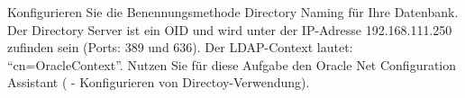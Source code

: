     \item Konfigurieren Sie die Benennungsmethode Directory Naming für Ihre
    Datenbank. Der Directory Server ist ein OID und wird unter der IP-Adresse
    192.168.111.250 zufinden sein (Ports: 389 und 636). Der LDAP-Context
    lautet: \enquote{cn=OracleContext}. Nutzen Sie für diese Aufgabe den
    Oracle Net Configuration Assistant ( - Konfigurieren von
    Directoy-Verwendung).
